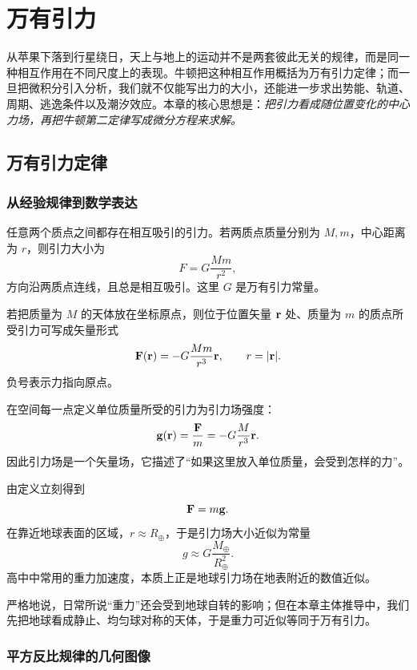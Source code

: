 \chapter{万有引力}

从苹果下落到行星绕日，天上与地上的运动并不是两套彼此无关的规律，而是同一种相互作用在不同尺度上的表现。牛顿把这种相互作用概括为万有引力定律；而一旦把微积分引入分析，我们就不仅能写出力的大小，还能进一步求出势能、轨道、周期、逃逸条件以及潮汐效应。本章的核心思想是：\emph{把引力看成随位置变化的中心力场，再把牛顿第二定律写成微分方程来求解。}

\section{万有引力定律}

\subsection{从经验规律到数学表达}

\begin{law}[牛顿万有引力定律]
任意两个质点之间都存在相互吸引的引力。若两质点质量分别为 $M,m$，中心距离为 $r$，则引力大小为
\[
F=G\frac{Mm}{r^2},
\]
方向沿两质点连线，且总是相互吸引。这里 $G$ 是万有引力常量。
\end{law}

若把质量为 $M$ 的天体放在坐标原点，则位于位置矢量 $\vb{r}$ 处、质量为 $m$ 的质点所受引力可写成矢量形式
\[
\vb{F}(\vb{r})=-G\frac{Mm}{r^3}\vb{r},\qquad r=\abs{\vb{r}}.
\]
负号表示力指向原点。

\begin{definition}[引力场]
在空间每一点定义单位质量所受的引力为引力场强度：
\[
\vb{g}(\vb{r})=\frac{\vb{F}}{m}=-G\frac{M}{r^3}\vb{r}.
\]
因此引力场是一个矢量场，它描述了“如果这里放入单位质量，会受到怎样的力”。
\end{definition}

由定义立刻得到
\[
\vb{F}=m\vb{g}.
\]
在靠近地球表面的区域，$r\approx R_\oplus$，于是引力场大小近似为常量
\[
g\approx G\frac{M_\oplus}{R_\oplus^2}.
\]
高中中常用的重力加速度，本质上正是地球引力场在地表附近的数值近似。

\begin{remark}
严格地说，日常所说“重力”还会受到地球自转的影响；但在本章主体推导中，我们先把地球看成静止、均匀球对称的天体，于是重力可近似等同于万有引力。
\end{remark}

\subsection{平方反比规律的几何图像}

